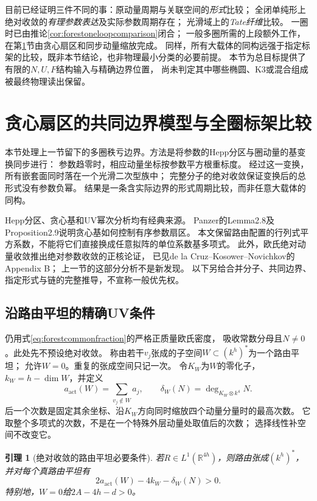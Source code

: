 \documentclass[11pt,a4paper]{ctexart}
\theoremstyle{cnplain}\newtheorem{theorem}{定理}[section]
\newtheorem{lemma}[theorem]{引理}
\theoremstyle{definition}\newtheorem{definition}[theorem]{定义}
\theoremstyle{remark}\newtheorem{remark}[theorem]{注}
\begin{document}
目前已经证明三件不同的事：原动量周期与关联空间的\emph{形式}比较；
全闭单纯形上绝对收敛的\emph{有理参数表达}及实际参数周期存在；
光滑域上的\emph{Tate纤维}比较。
一圈时已由推论\ref{cor:forestoneloopcomparison}闭合；
一般多圈所需的上段额外工作，在第\ref{sec:sectorboundary}节由贪心扇区和同步动量缩放完成。
同样，所有大载体的同构远强于指定标架的比较，既非本节结论，也非物理最小分类的必要前提。
本节为总目标提供了有限的$N,U,F$结构输入与精确边界位置，
尚未判定其中哪些椭圆、K3或混合组成被最终物理读出保留。


\section{贪心扇区的共同边界模型与全圈标架比较}
\label{sec:sectorboundary}

本节处理上一节留下的多圈秩亏边界。方法是将参数的Hepp分区与圈动量的基变换同步进行：
参数趋零时，相应动量坐标按参数平方根重标度。
经过这一变换，所有嵌套面同时落在一个光滑二次型族中；
完整分子的绝对收敛保证变换后的总形式没有参数负幂。
结果是一条含实际边界的形式周期比较，而非任意大载体的同构。

Hepp分区、贪心基和UV幂次分析均有经典来源。
Panzer的Lemma2.8及Proposition2.9说明贪心基如何控制有序参数扇区\cite{PanzerSector}。
本文保留路由配置的行列式平方系数，不能将它们直接换成任意拟阵的单位系数基多项式。
此外，欧氏绝对动量收敛推出绝对参数收敛的正核论证，
已见de la Cruz--Kosower--Novichkov的Appendix B\cite{CKNSector}；
上一节的这部分分析不是新发现。
以下另给合并分子、共同边界、指定形式与链的完整推导，不宣称一般优先权。

\subsection{沿路由平坦的精确UV条件}

仍用式\eqref{eq:forestcommonfraction}的严格正质量欧氏密度，
吸收常数分母且$N\ne0$。此处先不预设绝对收敛。
称由若干$v_j$张成的子空间$W\subset(k^h)^*$为一个路由平坦；
允许$W=0$。重复的张成空间只记一次。
令$K_W$为$W$的零化子，$k_W=h-\dim W$，并定义
\[
 a_{\mathrm{act}}(W)=\sum_{v_j\notin W}a_j,\qquad
 \delta_W(N)=\deg_{K_W\otimes k^4}N.
\]
后一个次数是固定其余坐标、沿$K_W$方向同时缩放四个动量分量时的最高次数。
它取整个多项式的次数，不是在一个特殊外层动量处取值后的次数；
选择线性补空间不改变它。

\begin{lemma}[绝对收敛的路由平坦必要条件]
\label{lem:sectoruv}
若$R\in L^1(\mathbb R^{4h})$，则路由张成$(k^h)^*$，并对每个真路由平坦有
\begin{equation}
 2a_{\mathrm{act}}(W)-4k_W-\delta_W(N)>0.
 \label{eq:sectoruvcriterion}
\end{equation}
特别地，$W=0$给$2A-4h-d>0$。
\end{lemma}
\end{document}
